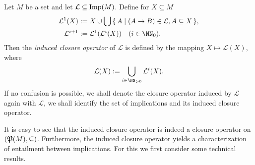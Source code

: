 \begin{Definition}
  \label{def:induced-closure-operator}
  Let $M$ be a set and let $\mathcal{L} \subseteq \operatorname{Imp}(M)$.  Define for $X \subseteq M$
  \begin{align*}
    \mathcal{L}^1(X) &:= X \cup \bigcup \set{ A \mid (A \to B) \in \mathcal{L}, A
      \subseteq X }, \\
    \mathcal{L}^{i + 1} &:= \mathcal{L}^1(\mathcal{L}^i(X)) \quad (i \in \NN_0).
  \end{align*}
  Then the \emph{induced closure operator} of $\mathcal{L}$ is defined by the mapping $X
  \mapsto \mathcal{L}(X)$, where
  \begin{equation*}
    \mathcal{L}(X) := \bigcup_{i \in \NN_{>0}}\mathcal{L}^i(X).
  \end{equation*}
  If no confusion is possible, we shall denote the closure operator induced by
  $\mathcal{L}$ again with $\mathcal{L}$, \ie we shall identify the set of implications
  and its induced closure operator.
\end{Definition}

It is easy to see that the induced closure operator is indeed a closure operator on
$({\mathfrak{P}(M)}, \subseteq)$.  Furthermore, the induced closure operator yields a
characterization of entailment between implications.  For this we first consider some
technical results.

